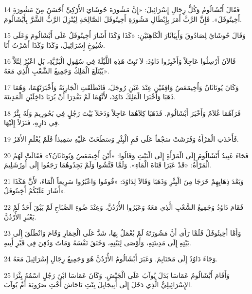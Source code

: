 \par 14 فَقَالَ أَبْشَالُومُ وَكُلُّ رِجَالِ إِسْرَائِيلَ: «إِنَّ مَشُورَةَ حُوشَايَ الأَرْكِيِّ أَحْسَنُ مِنْ مَشُورَةِ أَخِيتُوفَلَ». فَإِنَّ الرَّبَّ أَمَرَ بِإِبْطَالِ مَشُورَةِ أَخِيتُوفَلَ الصَّالِحَةِ لِيُنْزِلَ الرَّبُّ الشَّرَّ بِأَبْشَالُومَ.
\par 15 وَقَالَ حُوشَايُ لِصَادُوقَ وَأَبِيَاثَارَ الْكَاهِنَيْنِ: «كَذَا وَكَذَا أَشَارَ أَخِيتُوفَلُ عَلَى أَبْشَالُومَ وَعَلَى شُيُوخِ إِسْرَائِيلَ، وَكَذَا وَكَذَا أَشَرْتُ أَنَا.
\par 16 فَالآنَ أَرْسِلُوا عَاجِلاً وَأَخْبِرُوا دَاوُدَ: لاَ تَبِتْ هَذِهِ اللَّيْلَةَ فِي سُهُولِ الْبَرِّيَّةِ، بَلِ اعْبُرْ لِئَلاَّ يُبْتَلَعَ الْمَلِكُ وَجَمِيعُ الشَّعْبِ الَّذِي مَعَهُ».
\par 17 وَكَانَ يُونَاثَانُ وَأَخِيمَعَصُ وَاقِفَيْنِ عِنْدَ عَيْنِ رُوجَلَ، فَانْطَلَقَتِ الْجَارِيَةُ وَأَخْبَرَتْهُمَا، وَهُمَا ذَهَبَا وَأَخْبَرَا الْمَلِكَ دَاوُدَ، لأَنَّهُمَا لَمْ يَقْدِرَا أَنْ يُرَيَا دَاخِلَيْنِ الْمَدِينَةَ.
\par 18 فَرَآهُمَا غُلاَمٌ وَأَخْبَرَ أَبْشَالُومَ. فَذَهَبَا كِلاَهُمَا عَاجِلاً وَدَخَلاَ بَيْتَ رَجُلٍ فِي بَحُورِيمَ وَلَهُ بِئْرٌ فِي دَارِهِ، فَنَزَلاَ إِلَيْهَا.
\par 19 فَأَخَذَتِ الْمَرْأَةُ وَفَرَشَتْ سَجْفاً عَلَى فَمِ الْبِئْرِ وَسَطَحَتْ عَلَيْهِ سَمِيذاً فَلَمْ يُعْلَمِ الأَمْرُ.
\par 20 فَجَاءَ عَبِيدُ أَبْشَالُومَ إِلَى الْمَرْأَةِ إِلَى الْبَيْتِ وَقَالُوا: «أَيْنَ أَخِيمَعَصُ وَيُونَاثَانُ؟» فَقَالَتْ لَهُمُ الْمَرْأَةُ: «قَدْ عَبَرَا قَنَاةَ الْمَاءِ». وَلَمَّا فَتَّشُوا وَلَمْ يَجِدُوهُمَا رَجَعُوا إِلَى أُورُشَلِيمَ.
\par 21 وَبَعْدَ ذِهَابِهِمْ خَرَجَا مِنَ الْبِئْرِ وَذَهَبَا وَقَالاَ لِدَاوُدَ: «قُومُوا وَاعْبُرُوا سَرِيعاً الْمَاءَ، لأَنَّ هَكَذَا أَشَارَ عَلَيْكُمْ أَخِيتُوفَلُ».
\par 22 فَقَامَ دَاوُدُ وَجَمِيعُ الشَّعْبِ الَّذِي مَعَهُ وَعَبَرُوا الأُرْدُنَّ. وَعِنْدَ ضُوءِ الصَّبَاحِ لَمْ يَبْقَ أَحَدٌ لَمْ يَعْبُرِ الأُرْدُنَّ.
\par 23 وَأَمَّا أَخِيتُوفَلُ فَلَمَّا رَأَى أَنَّ مَشُورَتَهُ لَمْ يُعْمَلْ بِهَا، شَدَّ عَلَى الْحِمَارِ وَقَامَ وَانْطَلَقَ إِلَى بَيْتِهِ إِلَى مَدِينَتِهِ، وَأَوْصَى لِبَيْتِهِ، وَخَنَقَ نَفْسَهُ وَمَاتَ وَدُفِنَ فِي قَبْرِ أَبِيهِ.
\par 24 وَجَاءَ دَاوُدُ إِلَى مَحَنَايِمَ. وَعَبَرَ أَبْشَالُومُ الأُرْدُنَّ هُوَ وَجَمِيعُ رِجَالِ إِسْرَائِيلَ مَعَهُ.
\par 25 وَأَقَامَ أَبْشَالُومُ عَمَاسَا بَدَلَ يُوآبَ عَلَى الْجَيْشِ. وَكَانَ عَمَاسَا ابْنَ رَجُلٍ اسْمُهُ يِثْرَا الإِسْرَائِيلِيُّ الَّذِي دَخَلَ إِلَى أَبِيجَايِلَ بِنْتِ نَاحَاشَ أُخْتِ صَرُويَةَ أُمِّ يُوآبَ.
